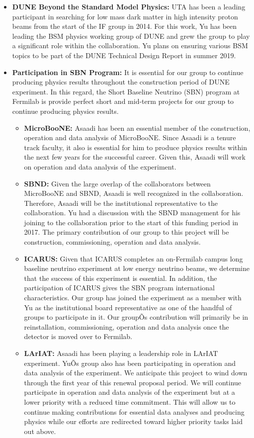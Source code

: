 \begin{itemize}
\item {{\bf DUNE Beyond the Standard Model Physics:} UTA has been a leading participant in searching for low mass dark matter in high intensity proton beams from the start of the IF group in 2014.   For this work, Yu has been leading the BSM physics working group of DUNE and grew the group to play a significant role within the collaboration.   Yu plans on ensuring various BSM topics to be part of the DUNE Technical Design Report in summer 2019.}
\item{{\bf Participation in SBN Program:} It is essential for our group to continue producing physics results throughout the construction period of DUNE experiment.   In this regard, the Short Baseline Neutrino (SBN) program at Fermilab is provide perfect short and mid-term projects for our group to continue producing physics results.}
\begin{itemize}


\item{{\bf MicroBooNE:} Asaadi has been an essential member of the construction, operation and data analysis of MicroBooNE.   Since Asaadi is a tenure track faculty, it also is essential for him to produce physics results within the next few years for the successful career.  Given this, Asaadi will work on operation and data analysis of the experiment.}
\item {{\bf SBND:} Given the large overlap of the collaborators between MicroBooNE and SBND, Asaadi is well recognized in the collaboration.  Therefore, Asaadi will be the institutional representative to the collaboration.  Yu had a discussion with the SBND management for his joining to the collaboration prior to the start of this funding period in 2017.  The primary contribution of our group to this project will be construction, commissioning, operation and data analysis.}
\item{{\bf ICARUS:} Given that ICARUS completes an on-Fermilab campus long baseline neutrino experiment at low energy neutrino beams, we determine that the success of this experiment is essential.  In addition, the participation of ICARUS gives the SBN program international characteristics.   Our group has joined the experiment as a member with Yu as the institutional board representative as one of the handful of groups to participate in it.   Our groupÕs contribution will primarily be in reinstallation, commissioning, operation and data analysis once the detector is moved over to Fermilab.}
\item{{\bf LArIAT:} Asaadi has been playing a leadership role in LArIAT experiment.  YuÕs group also has been participating in operation and data analysis of the experiment.   We anticipate this project to wind down through the first year of this renewal proposal period.  We will continue participate in operation and data analysis of the experiment but at a lower priority with a reduced time commitment.  This will allow us to continue making contributions for essential data analyses and producing physics while our efforts are redirected toward higher priority tasks laid out above.}
\end{itemize}

\end{itemize}


